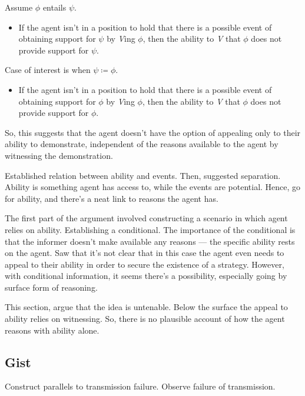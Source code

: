 \documentclass[10pt]{article}
\begin{document}
\begin{note}
  Assume \(\phi\) entails \(\psi\).
  \begin{itemize}
  \item If the agent isn't in a position to hold that there is a possible event of obtaining support for \(\psi\) by \emph{V}ing \(\phi\), then the ability to \emph{V} that \(\phi\) does not provide support for \(\psi\).
  \end{itemize}
  Case of interest is when \(\psi \coloneq \phi\).
  \begin{itemize}
  \item If the agent isn't in a position to hold that there is a possible event of obtaining support for \(\phi\) by \emph{V}ing \(\phi\), then the ability to \emph{V} that \(\phi\) does not provide support for \(\phi\).
  \end{itemize}
  So, this suggests that the agent doesn't have the option of appealing only to their ability to demonstrate, independent of the reasons available to the agent by witnessing the demonstration.
\end{note}

\newpage


Established relation between ability and events.
Then, suggested separation.
Ability is something agent has access to, while the events are potential.
Hence, go for ability, and there's a neat link to reasons the agent has.

The first part of the argument involved constructing a scenario in which agent relies on ability.
Establishing a conditional.
The importance of the conditional is that the informer doesn't make available any reasons --- the specific ability rests on the agent.
Saw that it's not clear that in this case the agent even needs to appeal to their ability in order to secure the existence of a strategy.
However, with conditional information, it seems there's a possibility, especially going by surface form of reasoning.

This section, argue that the idea is untenable.
Below the surface the appeal to ability relies on witnessing.
So, there is no plausible account of how the agent reasons with ability alone.


\subsection{Gist}
\label{sec:gist}

Construct parallels to transmission failure.
Observe failure of transmission.
\end{document}
